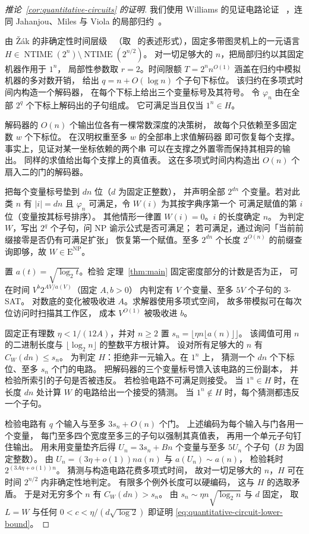 \begin{proof}[推论~\ref{cor:quantitative-circuits} 的证明]
我们使用 Williams 的见证电路论证
~\cite[Theorem~6.1]{Wil13}，连同 Jahanjou、Miles 与
Viola 的局部归约~\cite[Theorem~1 and Section~6]{JMV13}。

由 \v{Z}\'ak 的非确定性时间层级~\cite{Zak83}
（取~\cite[Theorem~2.1 in the full version]{Wil13}
的表述形式），固定多带图灵机上的一元语言
$H\in\operatorname{NTIME}(2^n)\setminus\operatorname{NTIME}(2^{n/2})$。
对一切足够大的 $n$，把局部归约以其固定机器作用于 $1^n$，
局部性参数取 $r=2$。时间限额 $T=2^n n^{O(1)}$
涵盖在归约中模拟机器的多对数开销，
给出 $q=n+O(\log n)$ 个子句下标位。
该归约在多项式时间内构造一个解码器，
在每个下标上给出三个变量标号及其符号。
令 $\varphi_n$ 由在全部 $2^q$ 个下标上解码出的子句组成。
它可满足当且仅当 $1^n\in H$。

解码器的 $O(n)$ 个输出位各有一棵常数深度的决策树，
故每个只依赖至多固定数 $w$ 个下标位。
在汉明权重至多 $w$ 的全部串上求值解码器
即可恢复每个支撑。事实上，见证对某一坐标依赖的两个串
可以在支撑之外置零而保持其相异的输出。
同样的求值给出每个支撑上的真值表。
这在多项式时间内构造出 $O(n)$ 个扇入二的门的解码器。

把每个变量标号垫到 $dn$ 位（$d$ 为固定正整数），
并声明全部 $2^{dn}$ 个变量。若对此类 $n$ 有 $|i|=dn$
且 $\varphi_n$ 可满足，令 $W(i)$ 为其按字典序第一个
可满足赋值的第 $i$ 位（变量按其标号排序）。
其他情形一律置 $W(i)=0$。$i$ 的长度确定 $n$。
为判定 $W$，写出 $2^q$ 个子句，问 NP 谕示公式是否可满足；
若可满足，通过询问「当前前缀接零是否仍有可满足扩张」
恢复第一个赋值。至多 $2^{dn}$ 个长度 $2^{O(n)}$
的前缀查询即够，故 $W\in\mathrm E^{\mathrm{NP}}$。

置 $a(t)=\sqrt{\log_2 t}$。检验
定理~\ref{thm:main} 固定密度部分的计数是否为正，
可在时间 $V^b2^{A V/a(V)}$（固定 $A,b>0$）
内判定有 $V$ 个变量、至多 $5V$ 个子句的 $3$-SAT。
对数底的变化被吸收进 $A$。求解器使用多项式空间，
故多带模拟可在每次位访问时扫描其工作区，
成本 $V^{O(1)}$ 被吸收进 $b$。

固定正有理数 $\eta<1/(12A)$，并对 $n\ge2$
置 $s_n=\lfloor\eta n\lfloor a(n)\rfloor\rfloor$。
该阈值可用 $n$ 的二进制长度与
$\lfloor\log_2 n\rfloor$ 的整数平方根计算。
设对所有足够大的 $n$ 有 $C_W(dn)\le s_n$。
为判定 $H$：拒绝非一元输入。在 $1^n$ 上，
猜测一个 $dn$ 个下标位、至多 $s_n$ 个门的电路。
把解码器的三个变量标号馈入该电路的三份副本，
并检验所索引的子句是否被违反。
若检验电路不可满足则接受。
当 $1^n\in H$ 时，在长度 $dn$ 处计算 $W$
的电路给出一个接受的猜测。
当 $1^n\notin H$ 时，每个猜测都违反一个子句。

检验电路有 $q$ 个输入与至多 $3s_n+O(n)$ 个门。
上述编码为每个输入与门各用一个变量，
每门至多四个宽度至多三的子句以强制其真值表，
再用一个单元子句钉住输出。
用未用变量垫齐后得 $U_n=3s_n+Bn$ 个变量与至多
$5U_n$ 个子句（$B$ 为固定整数）。
由 $U_n=(3\eta+o(1))n a(n)$ 与 $a(U_n)\sim a(n)$，
检验耗时 $2^{(3A\eta+o(1))n}$。
猜测与构造电路花费多项式时间，
故对一切足够大的 $n$，$H$
可在时间 $2^{n/2}$ 内非确定性地判定。
有限多个例外长度可以硬编码，
这与 $H$ 的选取矛盾。
于是对无穷多个 $n$ 有 $C_W(dn)>s_n$。
由 $s_n\sim\eta n\sqrt{\log_2 n}$ 与 $d$ 固定，
取 $L=W$ 与任何 $0<c<\eta/(d\sqrt{\log 2})$
即证明 \eqref{eq:quantitative-circuit-lower-bound}。
\end{proof}
